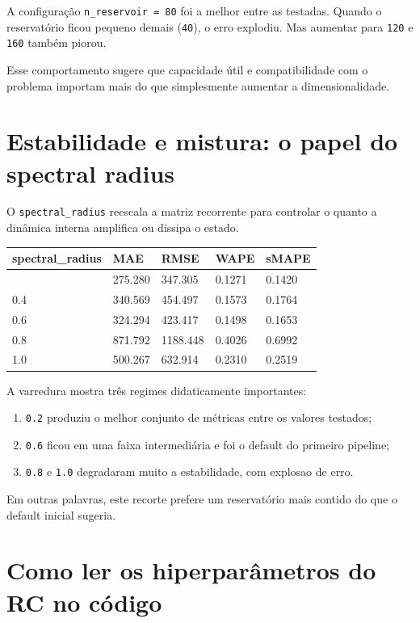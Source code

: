 \documentclass[12pt]{article}
\providecommand{\tightlist}{%
              \setlength{\itemsep}{0pt}\setlength{\parskip}{0pt}}
\begin{document}
A configuração \texttt{n\_reservoir\ =\ 80} foi a melhor entre as testadas. Quando o reservatório ficou pequeno demais (\texttt{40}), o erro explodiu. Mas aumentar para \texttt{120} e \texttt{160} também piorou.

Esse comportamento sugere que capacidade útil e compatibilidade com o problema importam mais do que simplesmente aumentar a dimensionalidade.

\section{Estabilidade e mistura: o papel do spectral radius}\label{5-estabilidade-e-mistura-o-papel-do-spectral-radius}

O \texttt{spectral\_radius} reescala a matriz recorrente para controlar o quanto a dinâmica interna amplifica ou dissipa o estado.

\begin{longtable}[]{@{}lllll@{}}
\toprule\noalign{}
spectral\_radius & MAE & RMSE & WAPE & sMAPE \\
\midrule\noalign{}
\endhead
\bottomrule\noalign{}
\endlastfoot
0.2 & 275.280 & 347.305 & 0.1271 & 0.1420 \\
0.4 & 340.569 & 454.497 & 0.1573 & 0.1764 \\
0.6 & 324.294 & 423.417 & 0.1498 & 0.1653 \\
0.8 & 871.792 & 1188.448 & 0.4026 & 0.6992 \\
1.0 & 500.267 & 632.914 & 0.2310 & 0.2519 \\
\end{longtable}

A varredura mostra três regimes didaticamente importantes:

\begin{enumerate}
\def\labelenumi{\arabic{enumi}.}
\tightlist
\item
  \texttt{0.2} produziu o melhor conjunto de métricas entre os valores testados;
\item
  \texttt{0.6} ficou em uma faixa intermediária e foi o default do primeiro pipeline;
\item
  \texttt{0.8} e \texttt{1.0} degradaram muito a estabilidade, com explosao de erro.
\end{enumerate}

Em outras palavras, este recorte prefere um reservatório mais contido do que o default inicial sugeria.

\section{Como ler os hiperparâmetros do RC no código}\label{6-como-ler-os-hiperparuxe2metros-do-rc-no-cuxf3digo}
\end{document}
